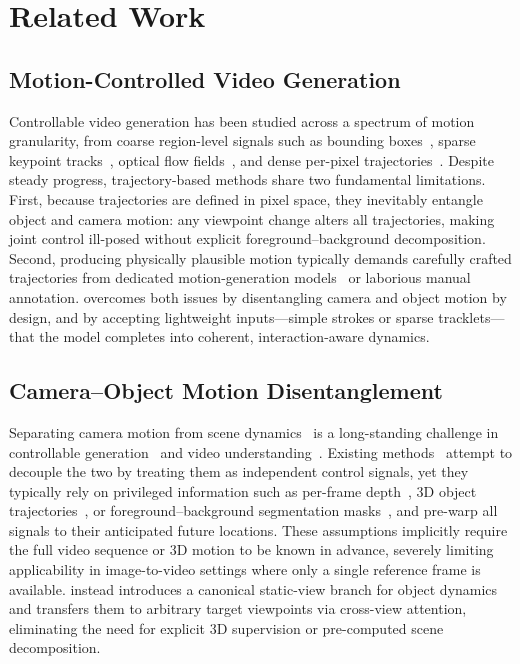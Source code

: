 \section{Related Work}
\label{sec:related}


\subsection{Motion-Controlled Video Generation}
Controllable video generation has been studied across a spectrum of motion granularity, from coarse region-level signals such as bounding boxes~\cite{wang2024boximator, ma2023trailblazer, xing2025motioncanvas}, sparse keypoint tracks~\cite{yin2023dragnuwa, MotionCtrl,wu2024draganything, li2025magicmotion}, optical flow fields~\cite{jin2025flovd, NSFF, zhang2025motionpro, FOMM, shi2024motion}, and dense per-pixel trajectories~\cite{geng2024motionprompting,chu2025wanmove}. Despite steady progress, trajectory-based methods share two fundamental limitations. First, because trajectories are defined in pixel space, they inevitably entangle object and camera motion: any viewpoint change alters all trajectories, making joint control ill-posed without explicit foreground--background decomposition. Second, producing physically plausible motion typically demands carefully crafted trajectories from dedicated motion-generation models~\cite{liu2025ponimator, lv2024gpt4motion, liu2024physgen, shi2024motion, chen2025physgen3d, montanaro2024motioncraft} or laborious manual annotation. \ours overcomes both issues by disentangling camera and object motion by design, and by accepting lightweight inputs---simple strokes or sparse tracklets---that the model completes into coherent, interaction-aware dynamics.

\subsection{Camera--Object Motion Disentanglement}
Separating camera motion from scene dynamics~\cite{huang2025vipe, li2025megasam, zhang2022structure, kopf2021robust, yao2025uni4d} is a long-standing challenge in controllable generation~\cite{MoCoGAN, Inmodegan, G3AN, geng2024motionprompting} and video understanding~\cite{liu2025visual, huang2025segment, wumotion}. Existing methods~\cite{zhang2025motionpro, gu2025diffusion, chen2025perception, shi2024motion} attempt to decouple the two by treating them as independent control signals, yet they typically rely on privileged information such as per-frame depth~\cite{gu2025diffusion, chen2025perception}, 3D object trajectories~\cite{karaev23cotracker, doersch2023tapir, harley2025alltracker}, or foreground--background segmentation masks~\cite{zhang2025motionpro, liang2024flowvid, niu2024mofa, shi2024motion}, and pre-warp all signals to their anticipated future locations. These assumptions implicitly require the full video sequence or 3D motion to be known in advance, severely limiting applicability in image-to-video settings where only a single reference frame is available. \ours instead introduces a canonical static-view branch for object dynamics and transfers them to arbitrary target viewpoints via cross-view attention, eliminating the need for explicit 3D supervision or pre-computed scene decomposition.



